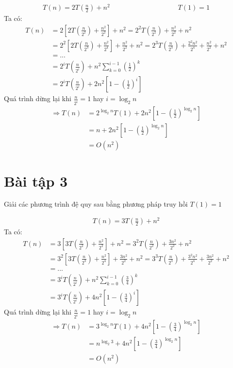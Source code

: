 \documentclass[12pt, a4paper, fleqn]{article}
\begin{document}
\begin{align*}
T(n) = 2T\left(\frac{n}{2}\right) + n^2 \qquad\qquad\qquad\qquad\qquad T(1) = 1
\end{align*}
Ta có:
\begin{align*}
T(n) &= 2\left[2T\left(\frac{n}{2^2}\right)+\frac{n^2}{2^2}\right]+n^2=2^2T\left(\frac{n}{2^2}\right)+\frac{n^2}{2^2}+n^2\\
&=2^2\left[2T\left(\frac{n}{2^3}\right)+\frac{n^2}{2^4}\right]+\frac{n^2}{2^2}+n^2=2^3T\left(\frac{n}{2^3}\right)+\frac{2^2n^2}{2^4}+\frac{n^2}{2^2}+n^2\\
&=...\\
&=2^iT\left(\frac{n}{2^i}\right)+n^2\sum_{k=0}^{i-1}\left(\frac{1}{2}\right)^k\\
&=2^iT\left(\frac{n}{2^i}\right)+2n^2\left[1-\left(\frac{1}{2}\right)^i\right]
\end{align*}
Quá trình dừng lại khi $\displaystyle \frac{n}{2 ^ i} = 1$ hay $i = \log_{2}{n}$\\
\begin{align*}
\Rightarrow T(n) &= 2^{\log_{2}{n}}T(1)+2n^2\left[1-\left(\frac{1}{2}\right)^{\log_{2}{n}}\right]\\
&= n+2n^2\left[1-\left(\frac{1}{2}\right)^{\log_{2}{n}}\right]\\
&= O(n^2)
\end{align*}

	
\clearpage

\section*{Bài tập 3}
Giải các phương trình đệ quy sau bằng phương pháp truy hồi
$T(1) = 1$

\begin{align*}
T(n) = 3T\left(\frac{n}{2}\right) + n ^ 2
\end{align*}
Ta có:
\begin{align*}
T(n) &= 3\left[3T\left(\frac{n}{2^2}\right)+\frac{n^2}{2^2}\right]+n^2=3^2T\left(\frac{n}{2^2}\right)+\frac{3n^2}{2^2}+n^2\\
	 &=3^2\left[3T\left(\frac{n}{2^3}\right)+\frac{n^2}{2^4}\right]+\frac{3n^2}{2^2}+n^2=3^3T\left(\frac{n}{2^3}\right)+\frac{3^2n^2}{2^4}+\frac{3n^2}{2^2}+n^2\\
	 &=...\\
	 &=3^iT\left(\frac{n}{2^i}\right)+n^2\sum_{k=0}^{i-1}\left({\frac{3}{4}}\right)^k\\
	 &=3^iT\left(\frac{n}{2^i}\right)+4n^2\left[1-\left(\frac{3}{4}\right)^i\right]
\end{align*}
Quá trình dừng lại khi $\displaystyle \frac{n}{2 ^ i} = 1$ hay $i = \log_{2}{n}$
\setlength{\abovedisplayskip}{3pt}%
\setlength{\belowdisplayskip}{3pt}%
\begin{align*}
\Rightarrow T(n) &= 3^{\log_{2}{n}}T(1)+4n^2\left[1-\left(\frac{3}{4}\right)^{\log_{2}{n}}\right]\\
				 &= n^{\log_{2}{3}}+4n^2\left[1-\left(\frac{3}{4}\right)^{\log_{2}{n}}\right]\\
				 &=O(n^2)
\end{align*}
\end{document}
